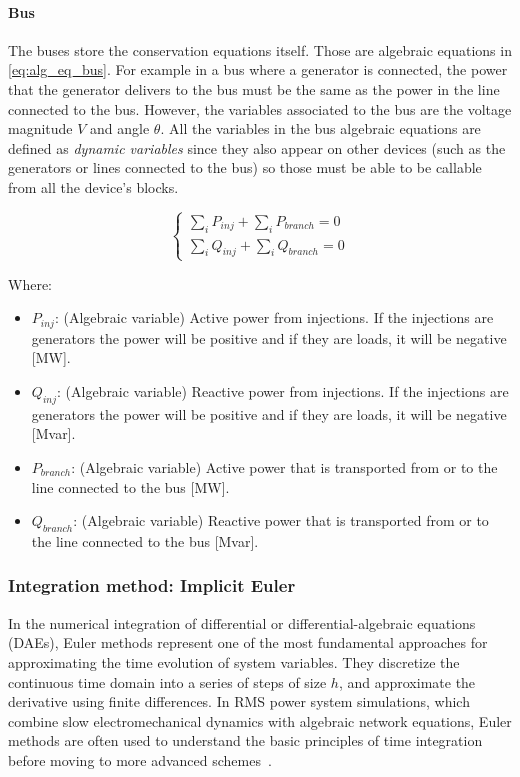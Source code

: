 \paragraph{Bus}
The buses store the conservation equations itself. Those are algebraic equations in \ref{eq:alg_eq_bus}. For example in a bus where a 
generator is connected, the power that the generator delivers to the bus must be the same as the power in the line connected to the bus. However, the
variables associated to the bus are the voltage magnitude $V$ and angle $\theta$.
All the variables in the bus algebraic equations are defined as \textit{dynamic variables} since they also appear on other devices (such as 
the generators or lines connected to the bus) so those must be able to be callable from all the device's blocks.

\begin{equation}
\begin{cases}
\sum_i P_{inj} + \sum_i P_{branch} = 0\\
\sum_i Q_{inj} + \sum_i Q_{branch} = 0
\end{cases}
\label{eq:alg_eq_bus}
\end{equation}

Where:
\begin{itemize}
  \item $P_{inj}$: (Algebraic variable) Active power from injections. If the injections are generators the power will be positive and if they are loads, it will be negative [MW].
  \item $Q_{inj}$: (Algebraic variable) Reactive power from injections. If the injections are generators the power will be positive and if they are loads, it will be negative [Mvar].
  \item $P_{branch}$: (Algebraic variable) Active power that is transported from or to the line connected to the bus [MW].
  \item $Q_{branch}$: (Algebraic variable) Reactive power that is transported from or to the line connected to the bus [Mvar].
\end{itemize}

\subsubsection{Integration method: Implicit Euler}

In the numerical integration of differential or differential-algebraic equations (DAEs), Euler methods represent one of the most fundamental approaches
for approximating the time evolution of system variables. They discretize the continuous time domain into a series of steps of size $h$,
and approximate the derivative using finite differences. In RMS power system simulations, which combine slow electromechanical dynamics with algebraic network equations,
Euler methods are often used to understand the basic principles of time integration before moving to more advanced schemes~\cite{Butcher2008}.


